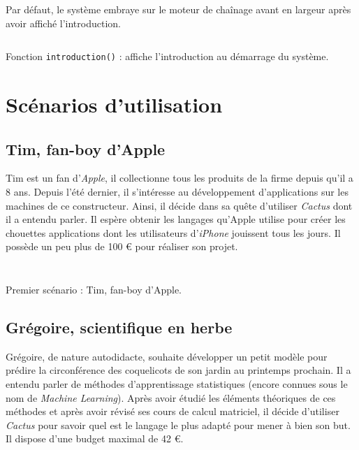 \documentclass[a4paper,12pt]{article}
\begin{document}
	Par défaut, le système embraye sur le moteur de chaînage avant en largeur après avoir affiché l'introduction.
	
\begin{listing}[H]
	\centering
	\inputminted[breaklines=true,linenos]{lisp}{../intro.lisp}
	\caption{Fonction \texttt{introduction()} : affiche l'introduction au démarrage du système.}
\end{listing}
	
\section{Scénarios d'utilisation}

	\subsection{Tim, fan-boy d'Apple}
	
	Tim est un fan d'\textit{Apple}, il collectionne tous les produits de la firme depuis qu'il a 8 ans. Depuis l'été dernier, il s'intéresse au développement d'applications sur les machines de ce constructeur. Ainsi, il décide dans sa quête d'utiliser \textit{Cactus} dont il a entendu parler. Il espère obtenir les langages qu'Apple utilise pour créer les chouettes applications dont les utilisateurs d'\textit{iPhone} jouissent tous les jours. Il possède un peu plus de 100 € pour réaliser son projet.

\begin{listing}[H]
	\centering
	\inputminted[breaklines=true,linenos,lastline=29]{text}{../scenarioTim.txt}
\end{listing}
	
\begin{listing}[H]
	\centering
	\inputminted[breaklines=true,linenos,firstline=30]{text}{../scenarioTim.txt}
	\caption{Premier scénario : Tim, fan-boy d'Apple.}
\end{listing}


	\subsection{Grégoire, scientifique en herbe}
	
	Grégoire, de nature autodidacte, souhaite développer un petit modèle pour prédire la circonférence des coquelicots de son jardin au printemps prochain. Il a entendu parler de méthodes d'apprentissage statistiques (encore connues sous le nom de \textit{Machine Learning}). Après avoir étudié les éléments théoriques de ces méthodes et après avoir révisé ses cours de calcul matriciel, il décide d'utiliser \textit{Cactus} pour savoir quel est le langage le plus adapté pour mener à bien son but. Il dispose d'une budget maximal de 42 €.
\end{document}

